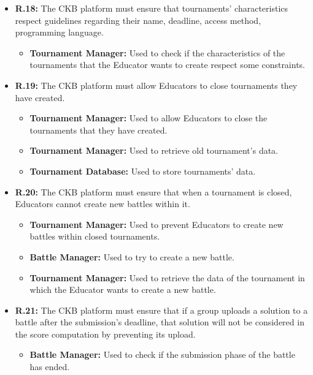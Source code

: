 \documentclass{article}
\begin{document}
{\begin{itemize}
\begin{itemize}
          \end{itemize}
    \item \textbf{R.18:} The CKB platform must ensure that tournaments' characteristics respect guidelines regarding their
          name, deadline, access method, programming language.
          \begin{itemize}
              \item \textbf{Tournament Manager:} Used to check if the characteristics of the tournaments
              that the Educator wants to create respect some constraints.
          \end{itemize}
    \item \textbf{R.19:} The CKB platform must allow Educators to close tournaments they have created.
          \begin{itemize}
              \item \textbf{Tournament Manager:} Used to allow Educators to close the tournaments that they have
              created.
              \item \textbf{Tournament Manager:} Used to retrieve old tournament's data.
              \item \textbf{Tournament Database:} Used to store tournaments' data.
          \end{itemize}
    \item \textbf{R.20:} The CKB platform must ensure that when a tournament is closed, Educators cannot create new battles
          within it.
          \begin{itemize}
              \item \textbf{Tournament Manager:} Used to prevent Educators to create new battles
                within closed tournaments.
            \item \textbf{Battle Manager:} Used to try to create a new battle.
            \item \textbf{Tournament Manager:} Used to retrieve the data of the tournament in which
            the Educator wants to create a new battle. 
          \end{itemize}
    \item \textbf{R.21:} The CKB platform must ensure that if a group uploads a solution to a battle after the submission's deadline,
          that solution will not be considered in the score computation by preventing its upload.
          \begin{itemize}
              \item \textbf{Battle Manager:} Used to check if the submission phase of the battle has ended.

\end{itemize}
\end{itemize}}
\end{document}
